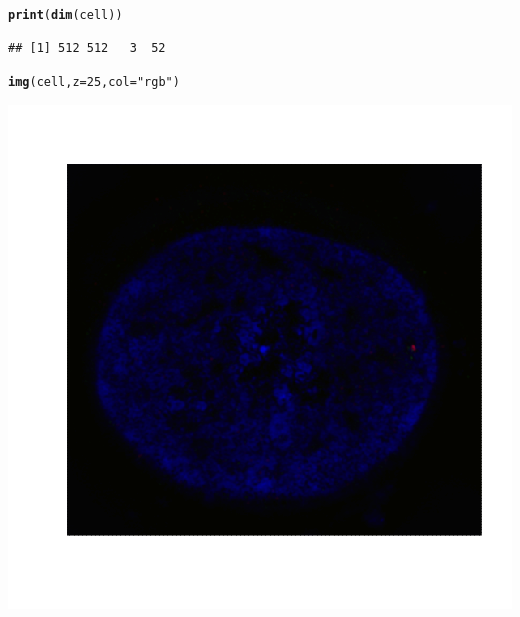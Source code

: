 \documentclass{article}\usepackage[]{graphicx}\usepackage[]{color}
\makeatletter
\def\maxwidth{ %
  \ifdim\Gin@nat@width>\linewidth
    \linewidth
  \else
    \Gin@nat@width
  \fi
}
\newcommand{\hlnum}[1]{\textcolor[rgb]{0.686,0.059,0.569}{#1}}%
\newcommand{\hlstr}[1]{\textcolor[rgb]{0.192,0.494,0.8}{#1}}%
\newcommand{\hlstd}[1]{\textcolor[rgb]{0.345,0.345,0.345}{#1}}%
\newcommand{\hlkwc}[1]{\textcolor[rgb]{0.333,0.667,0.333}{#1}}%
\newcommand{\hlkwd}[1]{\textcolor[rgb]{0.737,0.353,0.396}{\textbf{#1}}}%
\newenvironment{kframe}{%
 \def\at@end@of@kframe{}%
 \ifinner\ifhmode%
  \def\at@end@of@kframe{\end{minipage}}%
  \begin{minipage}{\columnwidth}%
 \fi\fi%
 \def\FrameCommand##1{\hskip\@totalleftmargin \hskip-\fboxsep
 \colorbox{shadecolor}{##1}\hskip-\fboxsep
     \hskip-\linewidth \hskip-\@totalleftmargin \hskip\columnwidth}%
 \MakeFramed {\advance\hsize-\width
   \@totalleftmargin\z@ \linewidth\hsize
   \@setminipage}}%
 {\par\unskip\endMakeFramed%
 \at@end@of@kframe}
\newenvironment{knitrout}{}{} %
\makeatother
\begin{document}
\begin{knitrout}
\begin{kframe}
{\ttfamily\noindent\color{warningcolor}{\#\# Warning in readTIFF(file, all = TRUE, info = TRUE, as.is = as.is, native = native): TIFFReadDirectory: Unknown field with tag 50839 (0xc697) encountered}}\begin{alltt}
\hlkwd{print}\hlstd{(}\hlkwd{dim}\hlstd{(cell))}
\end{alltt}
\begin{verbatim}
## [1] 512 512   3  52
\end{verbatim}
\begin{alltt}
\hlkwd{img}\hlstd{(cell,} \hlkwc{z}\hlstd{=}\hlnum{25} \hlstd{,}\hlkwc{col}\hlstd{=}\hlstr{"rgb"}\hlstd{)}
\end{alltt}
\end{kframe}
\includegraphics[width=\maxwidth]{figure/unnamed-chunk-2-1} 

\end{knitrout}
\end{document}
